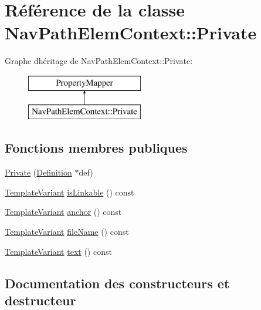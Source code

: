 \hypertarget{class_nav_path_elem_context_1_1_private}{}\section{Référence de la classe Nav\+Path\+Elem\+Context\+:\+:Private}
\label{class_nav_path_elem_context_1_1_private}
Graphe d\textquotesingle{}héritage de Nav\+Path\+Elem\+Context\+:\+:Private\+:\begin{figure}[H]
\begin{center}
\leavevmode
\includegraphics[height=2.000000cm]{class_nav_path_elem_context_1_1_private}
\end{center}
\end{figure}
\subsection*{Fonctions membres publiques}
\begin{DoxyCompactItemize}
\item 
\hyperlink{class_nav_path_elem_context_1_1_private_ae57e3fc2a7a42119c29b98433c16b27a}{Private} (\hyperlink{class_definition}{Definition} $\ast$def)
\item 
\hyperlink{class_template_variant}{Template\+Variant} \hyperlink{class_nav_path_elem_context_1_1_private_ac8f0216ac36d22b18bede0e1878cc5da}{is\+Linkable} () const 
\item 
\hyperlink{class_template_variant}{Template\+Variant} \hyperlink{class_nav_path_elem_context_1_1_private_aabf04954c346142046d5deaf57a63400}{anchor} () const 
\item 
\hyperlink{class_template_variant}{Template\+Variant} \hyperlink{class_nav_path_elem_context_1_1_private_a3d72c3104813b46b3decbc1374282321}{file\+Name} () const 
\item 
\hyperlink{class_template_variant}{Template\+Variant} \hyperlink{class_nav_path_elem_context_1_1_private_a65847fc188f2becdeb5467a18e765bc7}{text} () const 
\end{DoxyCompactItemize}


\subsection{Documentation des constructeurs et destructeur}
\hypertarget{class_nav_path_elem_context_1_1_private_ae57e3fc2a7a42119c29b98433c16b27a}{}

